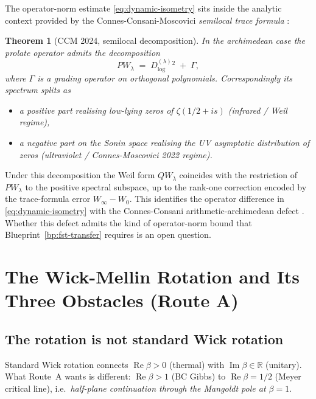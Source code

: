 \documentclass[11pt,a4paper]{article}
\theoremstyle{plain}
\newtheorem{theorem}{Theorem}[section]
\theoremstyle{definition}
\newcommand{\R}{\mathbb{R}}
\renewcommand{\Re}{\operatorname{Re}}
\renewcommand{\Im}{\operatorname{Im}}
\begin{document}
The operator-norm estimate \eqref{eq:dynamic-isometry} sits inside
the analytic context provided by the Connes-Consani-Moscovici
\emph{semilocal trace formula} \cite{ConnesConsaniMoscovici2024}:

\begin{theorem}[CCM 2024, semilocal decomposition]\label{thm:ccm-semilocal}
In the archimedean case the prolate operator admits the
decomposition
\[
  PW_\lambda \;=\; D^{(\lambda)}_{\log}{}^2 \;+\; \Gamma,
\]
where $\Gamma$ is a grading operator on orthogonal polynomials.
Correspondingly its spectrum splits as
\begin{itemize}[leftmargin=*]
\item a \emph{positive part} realising low-lying zeros of
  $\zeta(1/2+is)$ (infrared / Weil regime),
\item a \emph{negative part} on the Sonin space realising the UV
  asymptotic distribution of zeros
  (ultraviolet / Connes-Moscovici 2022 regime).
\end{itemize}
\end{theorem}

Under this decomposition the Weil form $QW_\lambda$ coincides with
the restriction of $PW_\lambda$ to the positive spectral subspace,
up to the rank-one correction encoded by the trace-formula error
$W_\infty - W_0$.  This identifies the operator difference in
\eqref{eq:dynamic-isometry} with the Connes-Consani
arithmetic-archimedean defect
\cite{ConnesConsaniWeilPositivity2020}.  Whether this defect admits
the kind of operator-norm bound that Blueprint~\ref{bp:fst-transfer}
requires is an open question.

\section{The Wick-Mellin Rotation and Its Three Obstacles (Route A)}
\label{sec:wick-mellin-obstacles}

\subsection{The rotation is not standard Wick rotation}

Standard Wick rotation connects $\Re\beta > 0$ (thermal) with
$\Im\beta \in \R$ (unitary).  What Route~A wants is different:
$\Re\beta > 1$ (BC Gibbs) to $\Re\beta = 1/2$ (Meyer critical line),
i.e.~\emph{half-plane continuation through the Mangoldt pole at
$\beta = 1$}.
\end{document}
